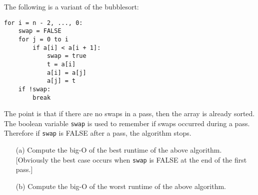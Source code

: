 The following is a variant of the bubblesort:
\begin{Verbatim}[frame=single, fontsize=\small]
for i = n - 2, ..., 0:
    swap = FALSE
    for j = 0 to i
        if a[i] < a[i + 1]:
            swap = true
            t = a[i]
            a[i] = a[j]
            a[j] = t
    if !swap:
        break
\end{Verbatim}
The point is that if there are no swaps in a pass, then
the array is already sorted.
The boolean variable \verb!swap! is used to remember if swaps
occurred during a pass.
Therefore if \verb!swap! is FALSE after a pass, the algorithm stops.
\begin{itemize}
\item[(a)] Compute the big-O of the best runtime of the above algorithm.
[Obviously the best case occurs when \verb!swap! is FALSE at the end of
the first pass.]
\item[(b)] Compute the big-O of the worst runtime of the above algorithm.
\end{itemize}

